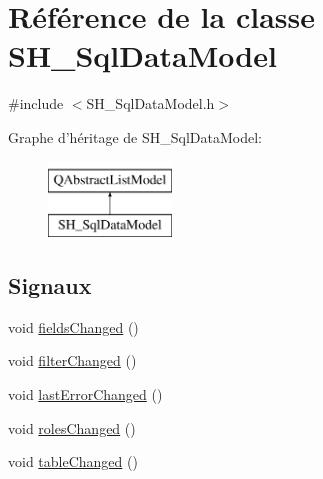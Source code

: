 \hypertarget{classSH__SqlDataModel}{\section{Référence de la classe S\-H\-\_\-\-Sql\-Data\-Model}
\label{classSH__SqlDataModel}
}


{\ttfamily \#include $<$S\-H\-\_\-\-Sql\-Data\-Model.\-h$>$}

Graphe d'héritage de S\-H\-\_\-\-Sql\-Data\-Model\-:\begin{figure}[H]
\begin{center}
\leavevmode
\includegraphics[height=2.000000cm]{classSH__SqlDataModel}
\end{center}
\end{figure}
\subsection*{Signaux}
\begin{DoxyCompactItemize}
\item 
void \hyperlink{classSH__SqlDataModel_a34a4750c1fb9c7ed05fe869d6de84e28}{fields\-Changed} ()
\item 
void \hyperlink{classSH__SqlDataModel_ab7bf039eba1e085b137509b7b93ea39b}{filter\-Changed} ()
\item 
void \hyperlink{classSH__SqlDataModel_a16f5316d5ca383f137d0d571931e4cc5}{last\-Error\-Changed} ()
\item 
void \hyperlink{classSH__SqlDataModel_acf85dacdcc946ef27377d221b16b0e41}{roles\-Changed} ()
\item 
void \hyperlink{classSH__SqlDataModel_a791a6cc9d8a2ba109fe5f54ab287dc80}{table\-Changed} ()
\end{DoxyCompactItemize}
